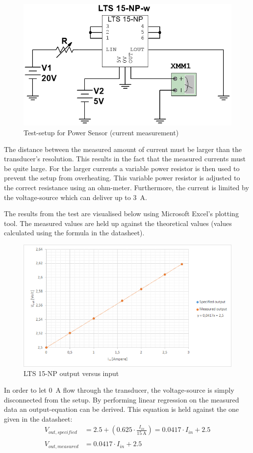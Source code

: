 \begin{figure}[H]
	\centering
	\includegraphics[width=0.55\linewidth]{Hardware/Pictures/PowerSensor_test}
	\caption{Test-setup for Power Sensor (current measurement)}
	\label{fig:PowerSensor_test}
\end{figure}

The distance between the measured amount of current must be larger than the transducer's resolution. This results in the fact that the measured currents must be quite large. For the larger currents a variable power resistor is then used to prevent the setup from overheating. This variable power resistor is adjusted to the correct resistance using an ohm-meter. Furthermore, the current is limited by the voltage-source which can deliver up to \SI{3}{\ampere}.

The results from the test are visualised below using Microsoft Excel's plotting tool. The measured values are held up against the theoretical values (values calculated using the formula in the datasheet).

\begin{figure}[H]
	\centering
	\includegraphics[width=0.9\linewidth]{Hardware/Pictures/PowerSensor_graph}
	\caption{LTS 15-NP output versus input}
	\label{fig:PowerSensor_graph}
\end{figure}

In order to let \SI{0}{\ampere} flow through the transducer, the voltage-source is simply disconnected from the setup. By performing linear regression on the measured data an output-equation can be derived. This equation is held against the one given in the datasheet:
\begin{equation}
	\begin{split}
			V_{out,specified} &= 2.5 + \left( 0.625 \cdot \frac{I_{in}}{\SI{15}{\ampere}} \right) = 0.0417 \cdot I_{in} + 2.5\\
			\\
			V_{out,measured} &= 0.0417 \cdot I_{in} + 2.5
	\end{split}
\end{equation}

